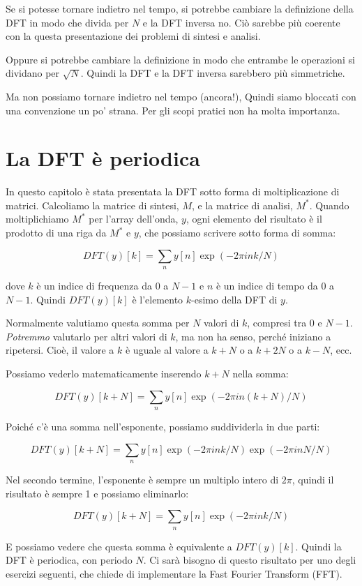 \documentclass[12pt]{book} \usepackage[width=5.5in,height=8.5in, hmarginratio=3:2,vmarginratio=1:1]{geometry}
\begin{document}
Se si potesse tornare indietro nel tempo, si potrebbe cambiare la definizione della DFT in modo che divida per $N$ e la DFT inversa no. Ciò sarebbe più coerente con la questa presentazione dei problemi di sintesi e analisi.

Oppure si potrebbe cambiare la definizione in modo che entrambe le operazioni si dividano per $\sqrt{N}$. Quindi la DFT e la DFT inversa sarebbero più simmetriche.

Ma non possiamo tornare indietro nel tempo (ancora!), Quindi siamo bloccati con una convenzione un po' strana. Per gli scopi pratici non ha molta importanza.

\section{La DFT è periodica} 

In questo capitolo è stata presentata la DFT sotto forma di moltiplicazione di matrici. Calcoliamo la matrice di sintesi, $M$, e la matrice di analisi, $M^*$. Quando moltiplichiamo $M^{*}$ per l'array dell'onda, $y$, ogni elemento del risultato è il prodotto di una riga da $M^*$ e $y$, che possiamo scrivere sotto forma di somma:

%
\[ DFT(y)[k] = \sum_n y[n] \exp(-2 \pi i n k / N) \] 

%
dove $k$ è un indice di frequenza da $0$ a $N-1$ e $n$ è un indice di tempo da $0$ a $N-1$. Quindi $DFT(y)[k]$ è l'elemento $k$-esimo della DFT di $y$.

Normalmente valutiamo questa somma per $N$ valori di $k$, compresi tra 0 e $N-1$. {\em Potremmo} valutarlo per altri valori di $k$, ma non ha senso, perché iniziano a ripetersi. Cioè, il valore a $k$ è uguale al valore a $k+N$ o a $k+2N$ o a $k-N$, ecc.

Possiamo vederlo matematicamente inserendo $k+N$ nella somma:

%
\[ DFT(y)[k+N] = \sum_n y[n] \exp(-2 \pi i n (k+N) / N) \] 

%
Poiché c'è una somma nell'esponente, possiamo suddividerla in due parti:

%
\[ DFT(y)[k+N] = \sum_n y[n] \exp(-2 \pi i n k / N) \exp(-2 \pi i n N / N) \] 

%
Nel secondo termine, l'esponente è sempre un multiplo intero di $2 \pi$, quindi il risultato è sempre 1 e possiamo eliminarlo:

%
\[ DFT(y)[k+N] = \sum_n y[n] \exp(-2 \pi i n k / N) \] 

%
E possiamo vedere che questa somma è equivalente a $ DFT(y)[k]$. Quindi la DFT è periodica, con periodo $N$. Ci sarà bisogno di questo risultato per uno degli esercizi seguenti, che chiede di implementare la Fast Fourier Transform (FFT).
\end{document}

